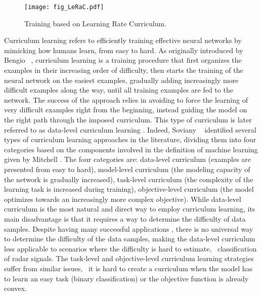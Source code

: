 \documentclass[10pt,twocolumn,letterpaper]{article}
\begin{document}
\begin{figure}[!t]
\begin{center}
\centerline{\texttt{[image: fig\_LeRaC.pdf]}}
\vspace{-0.25cm}
\caption{Training based on Learning Rate Curriculum.}
\label{fig_lerac}
\vspace{-1.1cm}
\end{center}
\end{figure}



Curriculum learning \cite{Bengio-ICML-2009} refers to efficiently training effective neural networks by mimicking how humans learn, from easy to hard. As originally introduced by Bengio \etal~\cite{Bengio-ICML-2009}, curriculum learning is a training procedure that first organizes the examples in their increasing order of difficulty, then starts the training of the neural network on the easiest examples, gradually adding increasingly more difficult examples along the way, until all training examples are fed to the network. The success of the approach relies in avoiding to force the learning of very difficult examples right from the beginning, instead guiding the model on the right path through the imposed curriculum. This type of curriculum is later referred to as data-level curriculum learning \cite{Soviany-IJCV-2022}. Indeed, Soviany \etal~\cite{Soviany-IJCV-2022} identified several types of curriculum learning approaches in the literature, dividing them into four categories based on the components involved in the definition of machine learning given by Mitchell \cite{Mitchell-MH-1997}. The four categories are: data-level curriculum (examples are presented from easy to hard), model-level curriculum (the modeling capacity of the network is gradually increased), task-level curriculum (the complexity of the learning task is increased during training), objective-level curriculum (the model optimizes towards an increasingly more complex objective). While data-level curriculum is the most natural and direct way to employ curriculum learning, its main disadvantage is that it requires a way to determine the difficulty of data samples. Despite having many successful applications \cite{Soviany-IJCV-2022,Wang-PAMI-2021}, there is no universal way to determine the difficulty of the data samples, making the data-level curriculum less applicable to scenarios where the difficulty is hard to estimate, \eg~classification of radar signals. The task-level and objective-level curriculum learning strategies suffer from similar issues, \eg~it is hard to create a curriculum when the model has to learn an easy task (binary classification) or the objective function is already convex.
\end{document}
